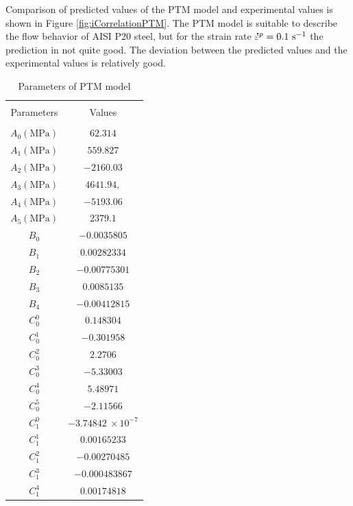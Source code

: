 \documentclass[twoside,english,1p,final,sort&compress]{elsarticle}
\theoremstyle{plain}
\newcommand{\mdot}[1]{\accentset{\mbox{\bfseries .}}{#1}}
\begin{document}
Comparison of predicted values of the PTM model and experimental values is shown in Figure \ref{fig:iCorrelationPTM}. The PTM model is suitable to describe the ﬂow behavior of AISI P20 steel, but for the strain rate $\mdot{\varepsilon}^p = 0.1\ \text{s}^{-1}$ the prediction in not quite good. The deviation between the predicted values and the experimental values is relatively good.
\begin{table}[!h]
\centering{}
\caption{Parameters of PTM model\label{tab:PTM-parameters}}
\begin{tabular}{cc}
\hline
&   \\
Parameters &Values\\
&   \\
\hline
$A_0 (\text{MPa})$ & $62.314$ \\
$A_1 (\text{MPa})$ & $559.827$ \\
$A_2 (\text{MPa})$ & $-2160.03$ \\
$A_3 (\text{MPa})$ & $4641.94,$ \\
$A_4 (\text{MPa})$ & $-5193.06$ \\
$A_5 (\text{MPa})$ & $2379.1$ \\
$B_0 $   & $-0.0035805$\\
$B_1 $   & $0.00282334$ \\
$B_2 $   & $-0.00775301$\\
$B_3 $   & $0.0085135$ \\
$B_4 $   & $-0.00412815$\\
$C_0^0 $ & $0.148304$ \\
$C_0^1 $ & $-0.301958$ \\
$C_0^2 $ & $2.2706$ \\
$C_0^3 $ & $-5.33003$ \\
$C_0^4 $ & $5.48971$ \\
$C_0^5 $ & $-2.11566$\\
$C_1^0 $ & $-3.74842\ \times10^{-7}$\\
$C_1^1 $ & $0.00165233$\\
$C_1^2 $ & $-0.00270485$ \\
$C_1^3 $ & $-0.000483867$\\
$C_1^4 $ & $0.00174818$ \\
\hline
\end{tabular}
\end{table}
\end{document}
